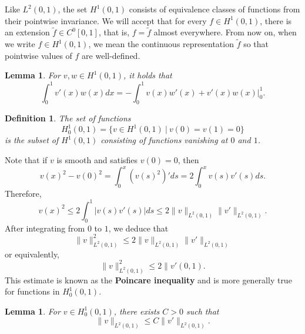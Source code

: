 \documentclass{article}
\newtheorem{lemma}[theorem]{Lemma}
\newtheorem{definition}[theorem]{Definition}
\theoremstyle{definition}
\theoremstyle{definition}
\begin{document}
Like $L^2(0,1)$, the set $H^1(0,1)$ consists of equivalence classes of functions from their pointwise invariance. We will accept that for every $f\in H^1(0,1)$, there is an extension $\tilde{f}\in C^0[0,1]$, that is, $f=\tilde{f}$ almost everywhere. From now on, when we write $f\in H^1(0,1)$, we mean the continuous representation $\tilde{f}$ so that pointwise values of $f$ are well-defined.
\begin{lemma}
    For $v,w\in H^1(0,1)$, it holds that
    $$\int_{0}^{1}v'(x)w(x)dx=-\int_{0}^{1}v(x)w'(x)+v'(x)w(x)\Bigg|_{0}^{1}.$$
\end{lemma}
\begin{definition}
    The set of functions
    $$H^1_0(0,1)=\{v\in H^1(0,1)\:|\:v(0)=v(1)=0\}$$
    is the subset of $H^1(0,1)$ consisting of functions vanishing at $0$ and $1$.
\end{definition}
Note that if $v$ is smooth and satisfies $v(0)=0$, then
$$v(x)^2-v(0)^2=\int_{0}^{x}(v(s)^2)'ds=2\int_{0}^{x}v(s)v'(s)ds.$$
Therefore,
$$v(x)^2\leq 2\int_{0}^{1}|v(s)v'(s)|ds\leq 2\|v\|_{L^2(0,1)}\|v'\|_{L^2(0,1)}.$$
After integrating from $0$ to $1$, we deduce that
$$\|v\|^2_{L^2(0,1)}\leq 2\|v\|_{L^2(0,1)}\|v'\|_{L^2(0,1)}$$
or equivalently,
$$\|v\|^2_{L^2(0,1)}\leq 2\|v'(0,1).$$
This estimate is known as the \textbf{Poincare inequality} and is more generally true for functions in $H^1_0(0,1)$.
\begin{lemma}
    For $v\in H^1_0(0,1)$, there exists $C>0$ such that
    $$\|v\|_{L^2(0,1)}\leq C\|v'\|_{L^2(0,1)}.$$
\end{lemma}
\end{document}
